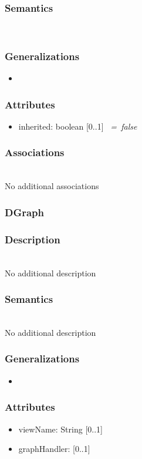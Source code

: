 \documentclass{article}
\begin{document}
\subsubsection*{Semantics} ~\\

\subsubsection*{Generalizations}
\begin{itemize}
\item {}
\end{itemize}
\subsubsection*{Attributes}
\begin{itemize}
\item inherited: boolean [0..1]  \textit{~=~false} 
\end{itemize}
\subsubsection*{Associations} ~\\ No additional associations
\subsubsection{DGraph}\label{DGraph} 
\subsubsection*{Description} ~\\ No additional description
\subsubsection*{Semantics} ~\\ No additional description
\subsubsection*{Generalizations}
\begin{itemize}
\item {}
\end{itemize}
\subsubsection*{Attributes}
\begin{itemize}
\item viewName: String [0..1] 
\item graphHandler:  [0..1] 
\end{itemize}
\end{document}
